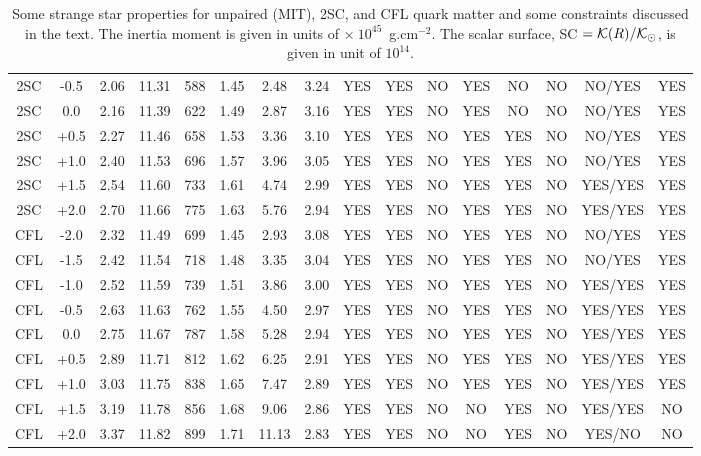 \documentclass[%
reprint,
superscriptaddress,
nofootinbib,
amsmath,
amssymb,
aps,
floatfix,
showkeys,
]{revtex4-2}
\begin{document}
\begin{sidewaystable*}
\begin{center}
\begin{tabular}{|cc|cccccc|cccccccc|}
2SC &  -0.5 & 2.06 & 11.31 & 588 & 1.45 & 2.48 & 3.24  & YES & YES & NO  & YES & NO & NO & NO/YES & YES\\
2SC &  0.0 & 2.16 & 11.39 & 622 & 1.49 & 2.87 & 3.16   & YES & YES & NO & YES & NO & NO & NO/YES & YES\\
2SC &  +0.5 & 2.27 & 11.46 & 658 & 1.53 & 3.36 & 3.10  & YES & YES & NO & YES & YES & NO & NO/YES & YES \\
2SC &  +1.0 & 2.40 & 11.53 & 696 & 1.57 & 3.96 & 3.05  & YES & YES & NO & YES & YES & NO & NO/YES &  YES \\
2SC &  +1.5 & 2.54 & 11.60 & 733 & 1.61 & 4.74 & 2.99  & YES & YES & NO & YES & YES & NO & YES/YES  & YES\\
2SC &  +2.0 & 2.70 & 11.66 & 775 & 1.63 & 5.76 & 2.94  & YES & YES & NO & YES & YES & NO & YES/YES & YES\\
\hline
CFL &  -2.0 & 2.32 & 11.49 & 699 & 1.45 & 2.93 & 3.08 & YES & YES & NO & YES & YES & NO & NO/YES & YES\\  
CFL &  -1.5 & 2.42 & 11.54 & 718 & 1.48 & 3.35 & 3.04  & YES & YES & NO & YES & YES & NO & NO/YES & YES\\  
CFL &  -1.0 & 2.52 & 11.59 & 739&  1.51 & 3.86 & 3.00   & YES & YES & NO & YES & YES & NO & YES/YES & YES\\  
CFL &  -0.5 & 2.63 & 11.63 & 762 & 1.55 & 4.50 & 2.97  & YES & YES & NO & YES & YES & NO & YES/YES & YES\\  
CFL &  0.0 & 2.75 & 11.67 & 787 & 1.58 & 5.28 & 2.94  & YES & YES & NO & YES & YES & NO & YES/YES & YES\\  
CFL &  +0.5 & 2.89 & 11.71 & 812 & 1.62 & 6.25 & 2.91  & YES & YES & NO & YES & YES & NO & YES/YES & YES\\  
CFL &  +1.0 & 3.03 & 11.75 & 838 & 1.65 & 7.47 & 2.89 & YES & YES & NO & YES & YES & NO & YES/YES & YES\\    
CFL &  +1.5 & 3.19 & 11.78 & 856 & 1.68 & 9.06 & 2.86  & YES & YES & NO & NO & YES & NO & YES/YES & NO\\  
CFL &  +2.0 & 3.37 & 11.82 & 899 & 1.71 & 11.13 & 2.83    & YES & YES & NO & NO & YES & NO & YES/NO & NO\\  
\hline
\end{tabular}
\caption{Some strange star properties for unpaired (MIT), 2SC, and CFL quark matter and some constraints discussed in the text. The inertia moment is given in units of  $\times~10^{45}$~g.cm$^{-2}$.  The scalar surface,  SC $={\cal{K}}(R)/{\cal{K}}_\odot$, is given in unit of $10^{14}$.}
\label{T1}
\end{center}
\end{sidewaystable*}
\end{document}
